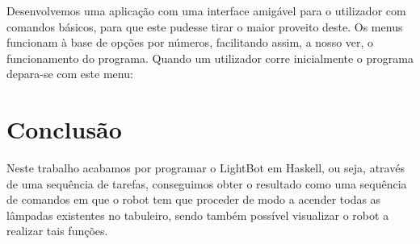 \documentclass[12pt,a4paper]{report}
\begin{document}
Desenvolvemos uma aplicação com uma interface amigável para o utilizador com comandos básicos, para que este pudesse tirar o maior proveito deste. Os menus funcionam à base de opções por números, facilitando assim, a nosso ver, o funcionamento do programa. 
Quando um utilizador corre inicialmente o programa depara-se com este menu:

\chapter{Conclusão}

Neste trabalho acabamos por programar o LightBot em Haskell, ou seja, através de uma sequência de tarefas, conseguimos obter o resultado como uma sequência de comandos em que o robot tem que proceder de modo a acender todas as lâmpadas existentes no tabuleiro, sendo também possível visualizar o robot a realizar tais funções.
\end{document}
